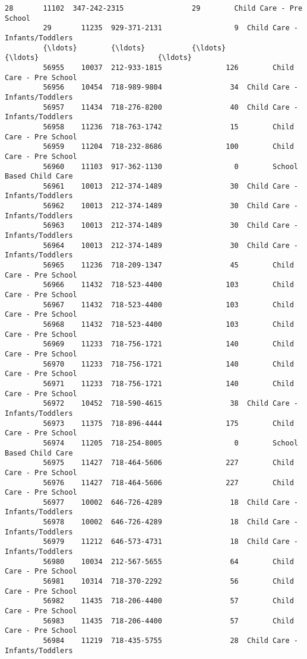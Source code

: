 \documentclass[11pt]{article}
\begin{document}
\begin{Verbatim}[commandchars=\\\{\}]
         28       11102  347-242-2315                29        Child Care - Pre School   
         29       11235  929-371-2131                 9  Child Care - Infants/Toddlers   
         {\ldots}        {\ldots}           {\ldots}               {\ldots}                            {\ldots}   
         56955    10037  212-933-1815               126        Child Care - Pre School   
         56956    10454  718-989-9804                34  Child Care - Infants/Toddlers   
         56957    11434  718-276-8200                40  Child Care - Infants/Toddlers   
         56958    11236  718-763-1742                15        Child Care - Pre School   
         56959    11204  718-232-8686               100        Child Care - Pre School   
         56960    11103  917-362-1130                 0        School Based Child Care   
         56961    10013  212-374-1489                30  Child Care - Infants/Toddlers   
         56962    10013  212-374-1489                30  Child Care - Infants/Toddlers   
         56963    10013  212-374-1489                30  Child Care - Infants/Toddlers   
         56964    10013  212-374-1489                30  Child Care - Infants/Toddlers   
         56965    11236  718-209-1347                45        Child Care - Pre School   
         56966    11432  718-523-4400               103        Child Care - Pre School   
         56967    11432  718-523-4400               103        Child Care - Pre School   
         56968    11432  718-523-4400               103        Child Care - Pre School   
         56969    11233  718-756-1721               140        Child Care - Pre School   
         56970    11233  718-756-1721               140        Child Care - Pre School   
         56971    11233  718-756-1721               140        Child Care - Pre School   
         56972    10452  718-590-4615                38  Child Care - Infants/Toddlers   
         56973    11375  718-896-4444               175        Child Care - Pre School   
         56974    11205  718-254-8005                 0        School Based Child Care   
         56975    11427  718-464-5606               227        Child Care - Pre School   
         56976    11427  718-464-5606               227        Child Care - Pre School   
         56977    10002  646-726-4289                18  Child Care - Infants/Toddlers   
         56978    10002  646-726-4289                18  Child Care - Infants/Toddlers   
         56979    11212  646-573-4731                18  Child Care - Infants/Toddlers   
         56980    10034  212-567-5655                64        Child Care - Pre School   
         56981    10314  718-370-2292                56        Child Care - Pre School   
         56982    11435  718-206-4400                57        Child Care - Pre School   
         56983    11435  718-206-4400                57        Child Care - Pre School   
         56984    11219  718-435-5755                28  Child Care - Infants/Toddlers   
         

\end{Verbatim}
\end{document}
